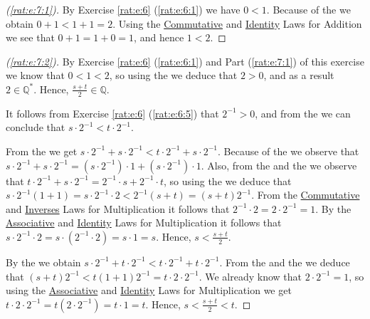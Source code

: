 \begin{proof}[(\ref{rat:e:7:1})]
	By Exercise \ref{rat:e:6} (\ref{rat:e:6:1}) we have $0 < 1$. Because of the  we obtain $0 + 1 < 1 + 1 = 2$. Using the \hyperref[rat:t:props:commutative_add]{Commutative} and \hyperref[rat:t:props:identity_add]{Identity} Laws for Addition we see that $0 + 1 = 1 + 0 = 1$, and hence $1 < 2$.
\end{proof}

\begin{proof}[(\ref{rat:e:7:2})]
	By Exercise \ref{rat:e:6} (\ref{rat:e:6:1}) and Part (\ref{rat:e:7:1}) of this exercise we know that ${0 < 1 < 2}$, so using the  we deduce that $2 > 0$, and as a result $2 \in \mathbb{Q}^{*}$. Hence, ${\frac{s + t}{2} \in \mathbb{Q}}$.

	It follows from Exercise \ref{rat:e:6} (\ref{rat:e:6:5}) that $2^{-1} > 0$, and from the  we can conclude that $s \cdot 2^{-1} < t \cdot 2^{-1}$.

	From the  we get $s \cdot 2^{-1} + s \cdot 2^{-1} < t \cdot 2^{-1} + s \cdot 2^{-1}$. Because of the  we observe that $s \cdot 2^{-1} + s \cdot 2^{-1} = (s \cdot 2^{-1}) \cdot 1 + (s \cdot 2^{-1}) \cdot 1$. Also, from the  and the  we observe that $t \cdot 2^{-1} + s \cdot 2^{-1} = 2^{-1} \cdot s + 2^{-1} \cdot t$, so using the  we deduce that $s \cdot 2^{-1}(1 + 1) = s \cdot 2^{-1} \cdot 2 < 2^{-1}(s + t) = (s + t)2^{-1}$. From the \hyperref[rat:t:props:commutative_mult]{Commutative} and  \hyperref[rat:t:props:inverses_mult]{Inverses} Laws for Multiplication it follows that $2^{-1} \cdot 2 = 2 \cdot 2^{-1} = 1$. By the \hyperref[rat:t:props:associative_mult]{Associative} and \hyperref[rat:t:props:identity_mult]{Identity} Laws for Multiplication it follows that $s \cdot 2^{-1} \cdot 2 = s \cdot (2^{-1} \cdot 2) = s \cdot 1 = s$. Hence, $s < \frac{s + t}{2}$.

	By the  we obtain $s \cdot 2^{-1} + t \cdot 2^{-1} < t \cdot 2^{-1} + t \cdot 2^{-1}$. From the  and the  we deduce that ${(s + t)2^{-1} < t (1 + 1)2^{-1} = t \cdot 2 \cdot 2^{-1}}$. We already know that $2 \cdot 2^{-1} = 1$, so using the \hyperref[rat:t:props:associative_mult]{Associative} and \hyperref[rat:t:props:identity_mult]{Identity} Laws for Multiplication we get $t \cdot 2 \cdot 2^{-1} = t(2 \cdot 2^{-1}) = t \cdot 1 = t$. Hence, $s < \frac{s + t}{2} < t$.
\end{proof}


